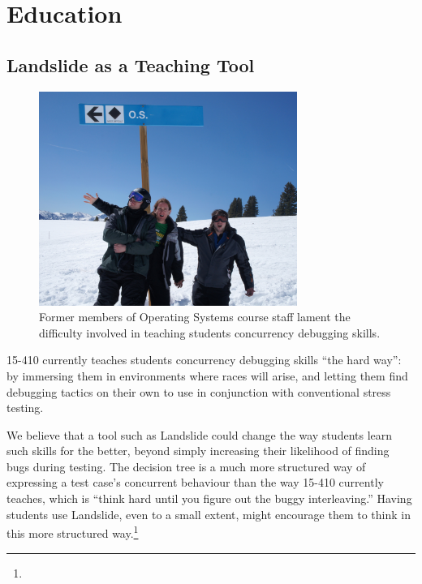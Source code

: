 \section{Education}
\label{sec:future-education}

\subsection{Landslide as a Teaching Tool}

\begin{figure}[h]
	\begin{center}
	\includegraphics[width=0.75\textwidth]{wont-modify-vail.jpg}
	\end{center}
	\caption{Former members of Operating Systems course staff lament the difficulty involved in teaching students concurrency debugging skills.}
\end{figure}

15-410 currently teaches students concurrency debugging skills ``the hard way'': by immersing them in environments where races will arise, and letting them find debugging tactics on their own to use in conjunction with conventional stress testing.

We believe that a tool such as Landslide could change the way students learn such skills for the better, beyond simply increasing their likelihood of finding bugs during testing. The decision tree is a much more structured way of expressing a test case's concurrent behaviour than the way 15-410 currently teaches, which is ``think hard until you figure out the buggy interleaving.'' Having students use Landslide, even to a small extent, might encourage them to think in this more structured way.\footnote{
}

